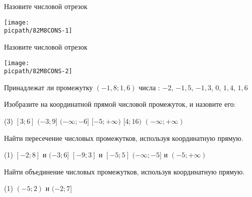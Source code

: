 \begin{exam}
	\begin{listofex}
		\item 
	\end{listofex}
\end{exam}

\begin{consultation}[number=1]
	\begin{listofex}
		\item 
		\begin{minipage}[t]{\bodywidth}
			Назовите числовой отрезок
		\end{minipage}
		\hspace{0.02\linewidth}
		\begin{minipage}[t]{\picwidth}
			\texttt{[image: \\picpath/82M8CONS-1]}
		\end{minipage}
		\item 
		\begin{minipage}[t]{\bodywidth}
			Назовите числовой отрезок
		\end{minipage}
		\hspace{0.02\linewidth}
		\begin{minipage}[t]{\picwidth}
			\texttt{[image: \\picpath/82M8CONS-2]}
		\end{minipage}
		\item Принадлежат ли промежутку \( (-1,8;1,6) \) числа : \( -2 \), \( -1,5 \), \( -1,3 \), \( 0 \), \( 1,4 \), \( 1,6 \)
		\item Изобразите на координатной прямой числовой промежуток, и назовите его:
		\begin{tasks}(3)
			\task \( [3;6] \)
			\task \( (-3;9] \)
			\task \( (-\infty;-6] \)
			\task \( [-5;+\infty) \)
			\task \( [4;16) \)
			\task \( (-\infty;+\infty )\)
		\end{tasks}
		\item Найти пересечение числовых промежутков, используя координатную прямую.
		\begin{tasks}(1)
			\task \( [-2;8] \) и \( (-3;6] \)
			\task \( [-9;3] \) и \( [-5;5] \)
			\task \( (-\infty;-5] \) и \( (-5;+\infty) \)
		\end{tasks}
		\item Найти объединение числовых промежутков, используя координатную прямую.
		\begin{tasks}(1)
			\task \( (-5;2) \) и \( (-2;7] \)

\end{tasks}
\end{listofex}
\end{consultation}
